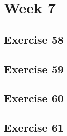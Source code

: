 \documentclass[a4paper]{article}
\let\stdsection\section
\renewcommand\section{\newpage\stdsection}
\begin{document}
\section*{Week 7}

\subsection*{Exercise 58}




\newpage
\subsection*{Exercise 59}


\newpage
\subsection*{Exercise 60}


\newpage
\subsection*{Exercise 61}




\newpage
\end{document}
